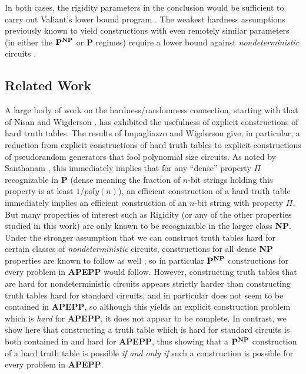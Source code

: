 \documentclass[11pt]{article}
\def\cl{\bf}
\begin{document}
In both cases, the rigidity parameters in the conclusion would be sufficient to carry out Valiant's lower bound program \cite{Valiant}. The weakest hardness assumptions previously known to yield constructions with even remotely similar parameters (in either the ${\cl P}^{\cl NP}$ or {\cl P} regimes) require a lower bound against \emph{nondeterministic} circuits \cite{AM-SV}.

\subsection{Related Work}
A large body of work on the hardness/randomness connection, starting with that of Nisan and Wigderson \cite{NW}, has exhibited the usefulness of explicit constructions of hard truth tables. The results of Impagliazzo and Wigderson \cite{IW} give, in particular, a reduction from explicit constructions of hard truth tables to explicit constructions of pseudorandom generators that fool polynomial size circuits. As noted by Santhanam \cite{explicit-constructions}, this immediately implies that for any ``dense'' property $\Pi$ recognizable in {\cl P} (dense meaning the fraction of $n$-bit strings holding this property is at least $1/poly(n)$), an efficient construction of a hard truth table immediately implies an efficient construction of an $n$-bit string with property $\Pi$. But many properties of interest such as Rigidity (or any of the other properties studied in this work) are only known to be recognizable in the larger class {\cl NP}. Under the stronger assumption that we can construct truth tables hard for certain classes of \emph{nondeterministic} circuits, constructions for all dense {\cl NP} properties are known to follow as well \cite{AM-derandomization} \cite{AM-SV}, so in particular ${\cl P}^{\cl NP}$ constructions for every problem in {\cl APEPP} would follow. However, constructing truth tables that are hard for nondeterministic circuits appears strictly harder than constructing truth tables hard for standard circuits, and in particular does not seem to be contained in {\cl APEPP}, so although this yields an explicit construction problem which is \emph{hard} for {\cl APEPP}, it does not appear to be complete. In contrast, we show here that constructing a truth table which is hard for standard circuits is both contained in and hard for {\cl APEPP}, thus showing that a ${\cl P}^{\cl NP}$ construction of a hard truth table is possible \emph{if and only if} such a construction is possible for every problem in {\cl APEPP}.
\end{document}
